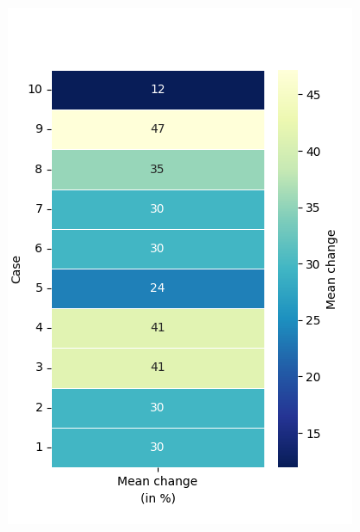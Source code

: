 \begin{figure}[h!]
	\centering
	\begin{subfigure}[t]{0.32\textwidth}
		\centering
		\includegraphics[width=\textwidth]{Figures/SP_mean_heatmap_percentage.png}
		\label{fig: SP_mean}
		\caption{}
	\end{subfigure}
	\hfill
	\begin{subfigure}[t]{0.32\textwidth}
		\centering

\end{subfigure}
\end{figure}
